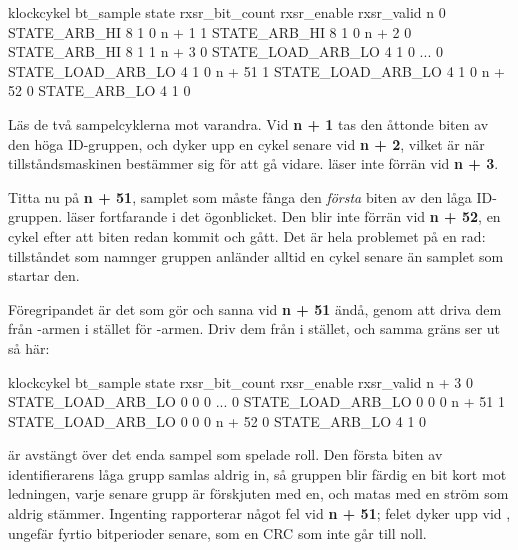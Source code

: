\begin{textdrawing}
klockcykel     bt_sample             state  rxsr_bit_count  rxsr_enable  rxsr_valid
n                      0         STATE_ARB_HI               8            1           0
n + 1                  1         STATE_ARB_HI               8            1           0
n + 2                  0         STATE_ARB_HI               8            1           1
n + 3                  0    STATE_LOAD_ARB_LO               4            1           0
...                    0    STATE_LOAD_ARB_LO               4            1           0
n + 51                 1    STATE_LOAD_ARB_LO               4            1           0
n + 52                 0         STATE_ARB_LO               4            1           0
\end{textdrawing}

Läs de två sampelcyklerna mot varandra. Vid \textbf{n + 1} tas den åttonde biten av den höga
ID-gruppen, och  dyker upp en cykel senare vid \textbf{n + 2}, vilket är när
tillståndsmaskinen bestämmer sig för att gå vidare.  läser inte 
förrän vid \textbf{n + 3}.

Titta nu på \textbf{n + 51}, samplet som måste fånga den \emph{första} biten av den låga ID-gruppen.
 läser fortfarande  i det ögonblicket. Den blir inte
 förrän vid \textbf{n + 52}, en cykel efter att biten redan kommit och gått. Det
är hela problemet på en rad: tillståndet som namnger gruppen anländer alltid en cykel senare än
samplet som startar den.

Föregripandet är det som gör  och  sanna vid
\textbf{n + 51} ändå, genom att driva dem från -armen i stället för
-armen. Driv dem från  i stället, och samma gräns ser ut så
här:

\begin{textdrawing}
klockcykel     bt_sample             state  rxsr_bit_count  rxsr_enable  rxsr_valid
n + 3                  0    STATE_LOAD_ARB_LO               0            0           0
...                    0    STATE_LOAD_ARB_LO               0            0           0
n + 51                 1    STATE_LOAD_ARB_LO               0            0           0
n + 52                 0         STATE_ARB_LO               4            1           0
\end{textdrawing}

 är avstängt över det enda sampel som spelade roll. Den första biten av
identifierarens låga grupp samlas aldrig in, så gruppen blir färdig en bit kort mot ledningen, varje
senare grupp är förskjuten med en, och  matas med en ström som aldrig stämmer. Ingenting
rapporterar något fel vid \textbf{n + 51}; felet dyker upp vid , ungefär
fyrtio bitperioder senare, som en CRC som inte går till noll.

